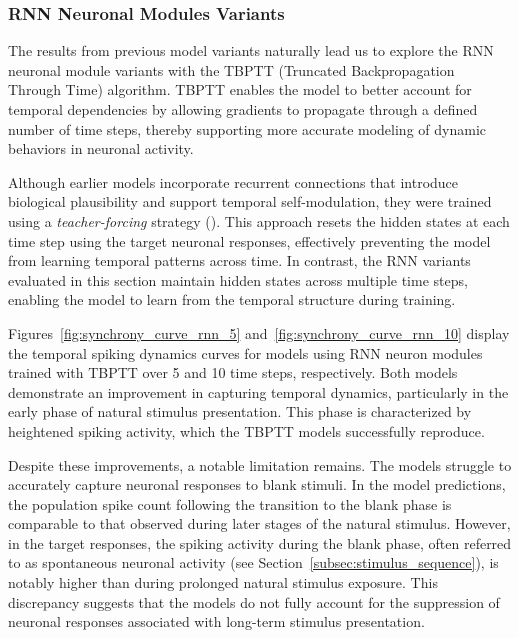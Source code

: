 \subsubsection{RNN Neuronal Modules Variants}
\label{{subsubsec:rnn_eval}}

The results from previous model variants naturally lead us to explore the RNN neuronal module variants with the TBPTT (Truncated Backpropagation Through Time) algorithm. TBPTT enables the model to better account for temporal dependencies by allowing gradients to propagate through a defined number of time steps, thereby supporting more accurate modeling of dynamic behaviors in neuronal activity.

Although earlier models incorporate recurrent connections that introduce biological plausibility and support temporal self-modulation, they were trained using a \emph{teacher-forcing} strategy (\citet{NIPS2016_16026d60}). This approach resets the hidden states at each time step using the target neuronal responses, effectively preventing the model from learning temporal patterns across time. In contrast, the RNN variants evaluated in this section maintain hidden states across multiple time steps, enabling the model to learn from the temporal structure during training.

Figures~\ref{fig:synchrony_curve_rnn_5} and~\ref{fig:synchrony_curve_rnn_10} display the temporal spiking dynamics curves for models using RNN neuron modules trained with TBPTT over 5 and 10 time steps, respectively. Both models demonstrate an improvement in capturing temporal dynamics, particularly in the early phase of natural stimulus presentation. This phase is characterized by heightened spiking activity, which the TBPTT models successfully reproduce.

Despite these improvements, a notable limitation remains. The models struggle to accurately capture neuronal responses to blank stimuli. In the model predictions, the population spike count following the transition to the blank phase is comparable to that observed during later stages of the natural stimulus. However, in the target responses, the spiking activity during the blank phase, often referred to as spontaneous neuronal activity (see Section~\ref{subsec:stimulus_sequence}), is notably higher than during prolonged natural stimulus exposure. This discrepancy suggests that the models do not fully account for the suppression of neuronal responses associated with long-term stimulus presentation.

